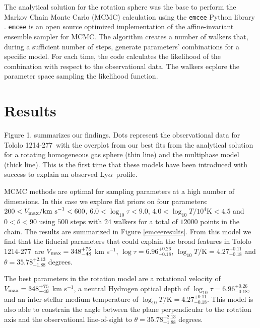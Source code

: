 \documentclass[a4,useAMS,usenatbib,usegraphicx]{mn2e}
\newcommand{\tol}{Tololo 1214-277}
\newcommand{\lya}{Ly$\alpha$}
\newcommand{\kms}{km s$^{-1}$}
\begin{document}
The analytical solution for the rotation sphere was the base to
perform the Markov Chain Monte Carlo (MCMC) calculation using the
\texttt{emcee} Python library \citep{2013PASP..125..306F}. \texttt{emcee} 
is an open source optimized implementation of the affine-invariant 
ensemble sampler for MCMC. The algorithm creates a number of walkers that,
during a sufficient number of steps, generate parameters' combinations for
a specific model. For each time, the code calculates the likelihood of the
combination with respect to the observational data. The walkers ecplore
the parameter space sampling the likelihood function.










\section{Results}


Figure 1. summarizes our findings.
Dots represent the observational data for \tol\ with the
overplot from our best fits from the analytical solution for a
rotating homogeneous gas sphere (thin line) and the multiphase
model (thick line). 
This is the first time that these models have been introduced with
success to explain an observed \lya\ profile.   


MCMC methods are optimal for sampling parameters at a high number of 
dimensions. In this case we explore flat priors on four parameters:
$200<V_{\rm max}/\mathrm{km\ s}^{-1} <600$,  
$6.0<\log_{10}\tau<9.0$, $4.0<\log_{10} T/10^4\mathrm{K}< 4.5$ and
$0<\theta<90$ using $500$ steps with $24$ walkers for a total of
$12000$ points in the chain. 
The results are summarized in 
Figure \ref{emceeresults}. 
From this model we find that the fiducial 
parameters that could explain the broad features in \tol\ are 
$V_{\rm max}=348^{+75}_{-48}$ km s$^{-1}$, $\log \tau = 6.96^{+0.26}_{-0.18}$, 
$\log_{10} T/\mathrm {K} = 4.27^{+0.11}_{-0.18}$ and $\theta = 35.78^{+2.13}_{-1.88}$ 
degrees.


The best parameters in the rotation model are a rotational velocity of 
$V_{\rm max}=348^{+75}_{-48}$ \kms, a neutral Hydrogen optical depth of 
$\log_{10}\tau=6.96^{+0.26}_{-0.18}$,  and an inter-stellar medium temperature of $\log_{10} T/\mathrm {K} = 4.27^{+0.11}_{-0.18}$.  
This model is also able to constrain the angle between the plane
perpendicular to the rotation axis and the observational line-of-sight
to $\theta = 35.78^{+2.13}_{-1.88}$ degrees.
\end{document}
